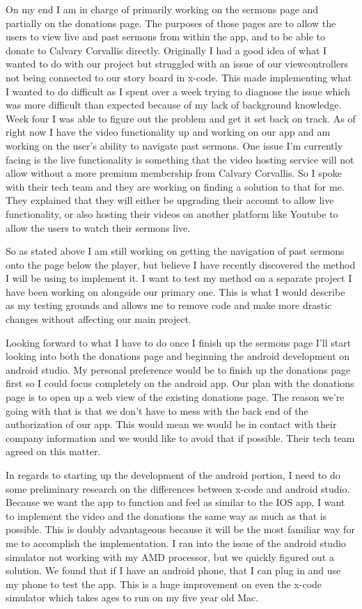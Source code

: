 \documentclass[letterpaper,10pt,draftclsnofoot,onecolumn,titlepage]{IEEEtran}
\begin{document}
On my end I am in charge of primarily working on the sermons page and partially on the donations page. 
The purposes of those pages are to allow the users to view live and past sermons from within the app, and to be able to donate to Calvary Corvallis directly. 
Originally I had a good idea of what I wanted to do with our project but struggled with an issue of our viewcontrollers not being connected to our story board in x-code. 
This made implementing what I wanted to do difficult as I spent over a week trying to diagnose the issue which was more difficult than expected because of my lack of background knowledge.  
Week four I was able to figure out the problem and get it set back on track. 
As of right now I have the video functionality up and working on our app and am working on the user’s ability to navigate past sermons. 
One issue I’m currently facing is the live functionality is something that the video hosting service will not allow without a more premium membership from Calvary Corvallis. 
So I spoke with their tech team and they are working on finding a solution to that for me. 
They explained that they will either be upgrading their account to allow live functionality, or also hosting their videos on another platform like Youtube to allow the users to watch their sermons live. 

So as stated above I am still working on getting the navigation of past sermons onto the page below the player, but believe I have recently discovered the method I will be using to implement it. 
I want to test my method on a separate project I have been working on alongside our primary one. 
This is what I would describe as my testing grounds and allows me to remove code and make more drastic changes without affecting our main project. 

Looking forward to what I have to do once I finish up the sermons page I’ll start looking into both the donations page and beginning the android development on android studio. 
My personal preference would be to finish up the donations page first so I could focus completely on the android app. 
Our plan with the donations page is to open up a web view of the existing donations page. 
The reason we’re going with that is that we don’t have to mess with the back end of the authorization of our app. 
This would mean we would be in contact with their company information and we would like to avoid that if possible. 
Their tech team agreed on this matter. 

In regards to starting up the development of the android portion, I need to do some preliminary research on the differences between x-code and android studio. 
Because we want the app to function and feel as similar to the IOS app, I want to implement the video and the donations the same way as much as that is possible. 
This is doubly advantageous because it will be the most familiar way for me to accomplish the implementation. 
I ran into the issue of the android studio simulator not working with my AMD processor, but we quickly figured out a solution. 
We found that if I have an android phone, that I can plug in and use my phone to test the app. 
This is a huge improvement on even the x-code simulator which takes ages to run on my five year old Mac.
\end{document}
